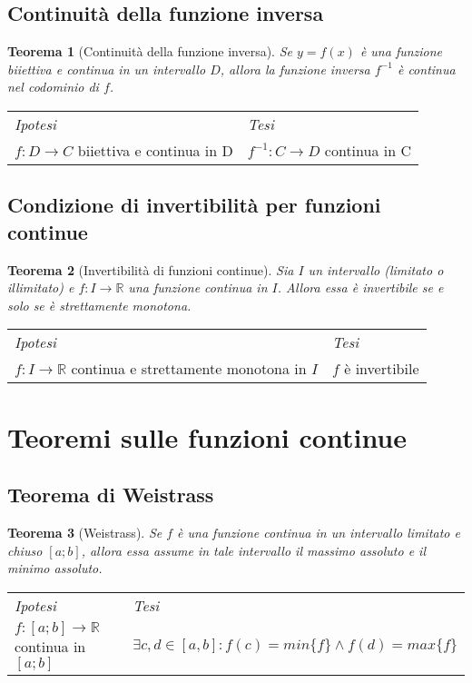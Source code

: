 \documentclass{article}     %
\newcommand\R{\mathbb{R}}
\newtheorem*{theorem}{Teorema}
\newenvironment{shadedTheorem}%
  {\begin{mdframed}[backgroundcolor=lightgray!40, linecolor=white, innertopmargin=4pt, innerbottommargin=13pt]\begin{theorem}}%
  {\end{theorem}\end{mdframed}}
\begin{document}
    \subsection{Continuità della funzione inversa}
        \begin{shadedTheorem}[Continuità della funzione inversa]
            Se $y=f(x)$ è una funzione biiettiva e continua in un intervallo $D$, allora la funzione inversa $f^{-1}$ è continua nel codominio di $f$.
        \end{shadedTheorem}
        \begin{tabular}{m{}m{}}
            \textit{Ipotesi} & \textit{Tesi}  \\
            $f:D\to C$ biiettiva e continua in D & $f^{-1}:C\to D$ continua in C 
        \end{tabular}
        
    \subsection{Condizione di invertibilità per funzioni continue}
        \begin{shadedTheorem}[Invertibilità di funzioni continue]
            Sia $I$ un intervallo (limitato o illimitato) e $f:I\rightarrow \R$ una funzione continua in $I$. Allora essa è invertibile se e solo se è strettamente monotona.
        \end{shadedTheorem}
        \begin{tabular}{m{}m{}}
            \textit{Ipotesi} & \textit{Tesi}  \\
            $f:I\to \R$ continua e strettamente monotona in $I$ & $f$ è invertibile 
        \end{tabular}
    
\section{Teoremi sulle funzioni continue}
    \subsection{Teorema di Weistrass}
        \begin{shadedTheorem}[Weistrass]
            Se $f$ è una funzione continua in un intervallo limitato e chiuso $[a;b]$, allora essa assume in tale intervallo il massimo assoluto e il minimo assoluto.
        \end{shadedTheorem}
        \begin{tabular}{m{}m{}}
            \textit{Ipotesi} & \textit{Tesi}  \\
            $f:[a;b]\to \R$ continua in $[a;b]$ & $\exists c,d \in [a,b] : f(c) = min\{f\} \land f(d) = max\{f\}$
        \end{tabular}
    
\end{document}
